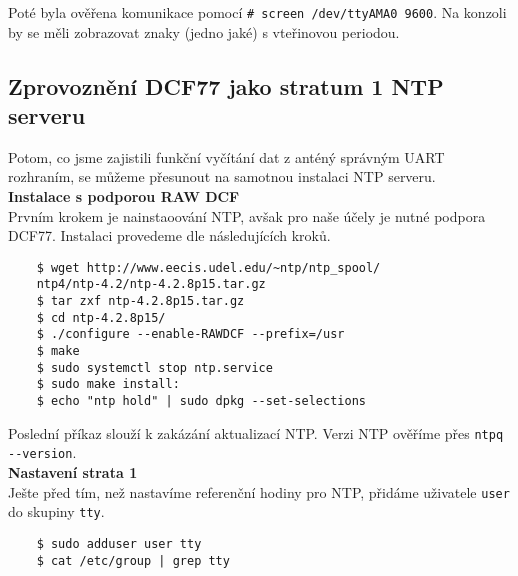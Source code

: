     \vspace{1em}

   Poté byla ověřena komunikace pomocí \verb|# screen /dev/ttyAMA0 9600|. Na konzoli by
   se měli zobrazovat znaky (jedno jaké) s vteřinovou periodou.

\newpage

\subsection{Zprovoznění DCF77 jako stratum 1 NTP serveru}
    Potom, co jsme zajistili funkční vyčítání dat z anténý správným UART rozhraním, se
    můžeme přesunout na samotnou instalaci NTP serveru.
    \\

    \textbf{Instalace s podporou RAW DCF}
    \\

    Prvním krokem je nainstaoování NTP, avšak pro naše účely je nutné podpora DCF77.
    Instalaci provedeme dle následujících kroků.

    \vspace{1em}

    \begin{lstlisting}
    $ wget http://www.eecis.udel.edu/~ntp/ntp_spool/
    ntp4/ntp-4.2/ntp-4.2.8p15.tar.gz
    $ tar zxf ntp-4.2.8p15.tar.gz
    $ cd ntp-4.2.8p15/
    $ ./configure --enable-RAWDCF --prefix=/usr
    $ make
    $ sudo systemctl stop ntp.service
    $ sudo make install:
    $ echo "ntp hold" | sudo dpkg --set-selections
    \end{lstlisting}

    \vspace{1em}

    Poslední příkaz slouží k zakázání aktualizací NTP. Verzi NTP ověříme přes
    \verb|ntpq --version|.
    \\

    \textbf{Nastavení strata 1}
    \\

    Ješte před tím, než nastavíme referenční hodiny pro NTP, přidáme uživatele \verb|user| do skupiny
    \verb|tty|.

    \vspace{1em}

    \begin{lstlisting}
    $ sudo adduser user tty
    $ cat /etc/group | grep tty
    \end{lstlisting}

    \vspace{1em}

